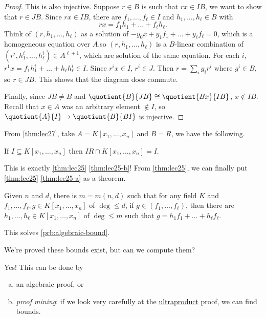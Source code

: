 \begin{proof}
	This is also injective. Suppose \(r\in B\) is such that \(rx\in IB\), we want to show that \(r\in JB\). Since \(rx \in I B\), there are \(f_1, \dots , f_{\ell } \in I\) and \(h_1, \dots , h_{\ell } \in B\) with
	\[
		rx = f_1 h_1 + \dots + f_{\ell } h_{\ell }.
	\]
	Think of \((r, h_1, \dots , h_{\ell } )\) as a solution of \(- y_0 x + y_1 f_1 + \dots + y_{\ell } f_{\ell } = 0\), which is a homogeneous equation over \(A\).so \((r, h_1, \dots , h_{\ell } )\) is a \(B\)-linear combination of \((r^i, h_1^i, \dots , h_{\ell }^i )\in A^{\ell + 1}\), which are solution of the same equation. For each \(i\), \(r^1 x = f_1 h_1^i + \dots + h_{\ell }h_{\ell } ^i\in I\). Since \(r^i x \in I\), \(r^i \in J\). Then \(r = \sum_{i} g_i r^i\) where \(g^i \in B\), so \(r\in JB\). This shows that the diagram does commute.

	Finally, since \(JB \neq B\) and \(\quotient{B}{JB} \cong \quotient{Bx}{IB} \), \(x \notin IB\). Recall that \(x\in A\) was an arbitrary element \(\notin I\), so \(\quotient{A}{I} \to \quotient{B}{BI} \) is injective.
\end{proof}

From \autoref{thm:lec27}, take \(A = K[x_1, \dots , x_n]\) and \(B = R\), we have the following.

\begin{corollary}
	If \(I \subseteq K[x_1, \dots , x_n]\) then \(IR \cap K[x_1, \dots , x_n] = I\).
\end{corollary}

This is exactly \autoref{thm:lec25} \autoref{thm:lec25-b}! From \autoref{thm:lec25}, we can finally put \autoref{thm:lec25} \autoref{thm:lec25-a} as a theorem.

\begin{theorem}
	Given \(n\) and \(d\), there is \(m = m(n, d)\) such that for any field \(K\) and \(f_1, \dots , f_{\ell }, g \in K[x_1, \dots , x_n]\) of \(\deg \leq d\), if \(g\in (f_1, \dots , f_{\ell } )\), then there are \(h_1, \dots , h_{\ell } \in K[x_1, \dots , x_n]\) of \(\deg \leq m\) such that \(g = h_1 f_1 + \dots + h_{\ell } f_{\ell } \).
\end{theorem}

This solves \autoref{prb:algebraic-bound}.

\begin{problem*}
	We're proved these bounds exist, but can we compute them?
\end{problem*}
\begin{answer}
	Yes! This can be done by
	\begin{enumerate}[(a)]
		\item an algebraic proof, or
		\item \emph{proof mining}: if we look very carefully at the \hyperref[def:ultraproduct]{ultraproduct} proof, we can find bounds.
	\end{enumerate}
\end{answer}

